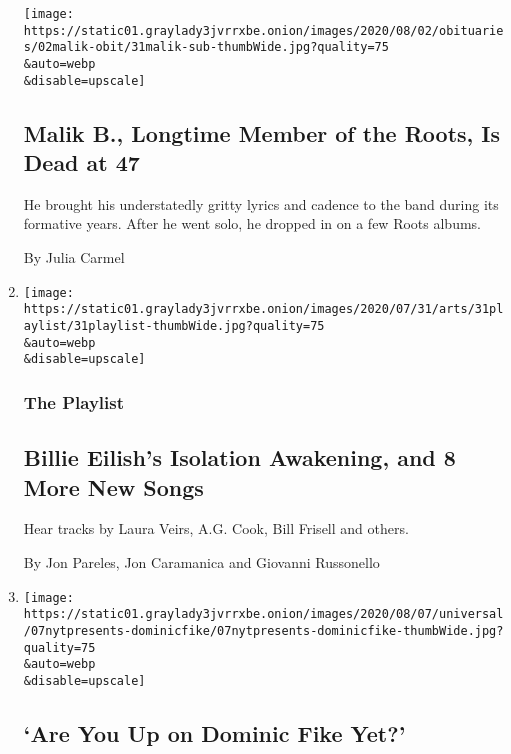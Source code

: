 \begin{enumerate}
  \texttt{[image: https://static01.graylady3jvrrxbe.onion/images/2020/08/02/obituaries/02malik-obit/31malik-sub-thumbWide.jpg?quality=75\\\&auto=webp\\\&disable=upscale]}

  \hypertarget{malik-b-longtime-member-of-the-roots-is-dead-at-47}{%
  \subsection{Malik B., Longtime Member of the Roots, Is Dead at
  47}\label{malik-b-longtime-member-of-the-roots-is-dead-at-47}}

  He brought his understatedly gritty lyrics and cadence to the band
  during its formative years. After he went solo, he dropped in on a few
  Roots albums.

  By Julia Carmel
\item
  \href{/2020/07/31/arts/music/playlist-billie-eilish-snakehips-a-boogie.html}{}

  \texttt{[image: https://static01.graylady3jvrrxbe.onion/images/2020/07/31/arts/31playlist/31playlist-thumbWide.jpg?quality=75\\\&auto=webp\\\&disable=upscale]}

  \hypertarget{the-playlist}{%
  \subsubsection{The Playlist}\label{the-playlist}}

  \hypertarget{billie-eilishs-isolation-awakening-and-8-more-new-songs}{%
  \subsection{Billie Eilish's Isolation Awakening, and 8 More New
  Songs}\label{billie-eilishs-isolation-awakening-and-8-more-new-songs}}

  Hear tracks by Laura Veirs, A.G. Cook, Bill Frisell and others.

  By Jon Pareles, Jon Caramanica and Giovanni Russonello
\item
  \href{/article/dominic-fike-at-first.html}{}

  \texttt{[image: https://static01.graylady3jvrrxbe.onion/images/2020/08/07/universal/07nytpresents-dominicfike/07nytpresents-dominicfike-thumbWide.jpg?quality=75\\\&auto=webp\\\&disable=upscale]}

  \hypertarget{are-you-up-on-dominic-fike-yet}{%
  \subsection{`Are You Up on Dominic Fike
  Yet?'}\label{are-you-up-on-dominic-fike-yet}}


\end{enumerate}
